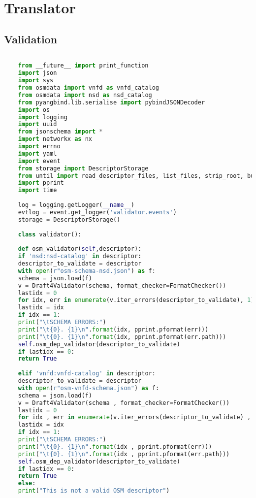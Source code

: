 \newpage
\section{Translator}
\subsection{Validation}
\label{tvalidation}

\begin{lstlisting}[language=Python,caption=Validating Sonata or Pishahang and OSM descriptors (Both NSD and VNFD's), label=tvalidation]
	
	from __future__ import print_function
	import json
	import sys
	from osmdata import vnfd as vnfd_catalog
	from osmdata import nsd as nsd_catalog
	from pyangbind.lib.serialise import pybindJSONDecoder
	import os
	import logging
	import uuid
	from jsonschema import *
	import networkx as nx
	import errno
	import yaml
	import event
	from storage import DescriptorStorage
	from until import read_descriptor_files, list_files, strip_root, build_descriptor_id
	import pprint
	import time
	
	log = logging.getLogger(__name__)
	evtlog = event.get_logger('validator.events')
	storage = DescriptorStorage()
	
	class validator():
	
	def osm_validator(self,descriptor):
	if 'nsd:nsd-catalog' in descriptor:
	descriptor_to_validate = descriptor
	with open(r"osm-schema-nsd.json") as f:
	schema = json.load(f)
	v = Draft4Validator(schema, format_checker=FormatChecker())
	lastidx = 0
	for idx, err in enumerate(v.iter_errors(descriptor_to_validate), 1):
	lastidx = idx
	if idx == 1:
	print("\tSCHEMA ERRORS:")
	print("\t{0}. {1}\n".format(idx, pprint.pformat(err)))
	print("\t{0}. {1}\n".format(idx, pprint.pformat(err.path)))
	self.osm_dep_validator(descriptor_to_validate)
	if lastidx == 0:
	return True
	
	elif 'vnfd:vnfd-catalog' in descriptor:
	descriptor_to_validate = descriptor
	with open(r"osm-vnfd-schema.json") as f:
	schema = json.load(f)
	v = Draft4Validator(schema , format_checker=FormatChecker())
	lastidx = 0
	for idx , err in enumerate(v.iter_errors(descriptor_to_validate) , 1):
	lastidx = idx
	if idx == 1:
	print("\tSCHEMA ERRORS:")
	print("\t{0}. {1}\n".format(idx , pprint.pformat(err)))
	print("\t{0}. {1}\n".format(idx , pprint.pformat(err.path)))
	self.osm_dep_validator(descriptor_to_validate)
	if lastidx == 0:
	return True
	else:
	print("This is not a valid OSM descriptor")
	

\end{lstlisting}
